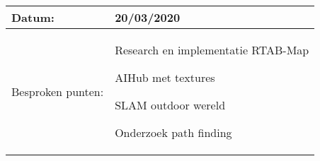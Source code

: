 \begin{tabularx}{\textwidth}{| l | X |}
  \hline
  Datum: & 20/03/2020\\
  \hline
  Besproken punten: &
  \begin{compactitem}
    \item Research en implementatie RTAB-Map
    \item AIHub met textures
    \item SLAM outdoor wereld
    \item Onderzoek path finding
  \end{compactitem}\\
  \hline
\end{tabularx}